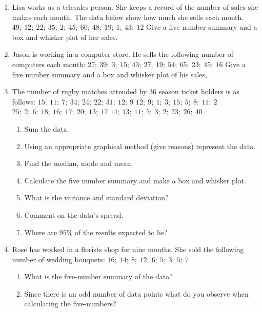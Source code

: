 {
\begin{enumerate}
\item Lisa works as a telesales person. She keeps a record of the number of sales she makes each month. The data below show how much she sells each month. \newline
\textbf{$49; ~12; ~22; ~35; ~2; ~45;~ 60; ~48; ~19; ~1;~ 43; ~12$} \newline
Give a five number summary and a box and whisker plot of her sales. 
\item Jason is working in a computer store. He sells the following number of computers each month: \newline
\textbf{$27; ~39; ~3; ~15; ~43; ~27; ~19; ~54; ~65; ~23; ~45; ~16$} \newline
Give a five number summary and a box and whisker plot of his sales,
\item The number of rugby matches attended by 36 season ticket holders is as follows: \newline
\textbf{$15; ~11;~ 7;~ 34;~ 24;~ 22;~ 31;~ 12;~ 9$} \newline
\textbf{$12;~ 9;~ 1;~ 3;~ 15;~ 5;~ 8;~ 11;~ 2$} \newline
\textbf{$25;~ 2;~ 6; ~18; ~16; ~17; ~20; ~13; ~17$} \newline
\textbf{$14;~ 13;~ 11; ~5; ~3; ~2; ~23; ~26; ~40$} \newline
	\begin{enumerate}
	\item Sum the data.
	\item Using an appropriate graphical method (give reasons) represent the data.
	\item Find the median, mode and mean.
	\item Calculate the five number summary and make a box and whisker plot.
	\item What is the variance and standard deviation?
	\item Comment on the data's spread.
	\item Where are $95\%$ of the results expected to lie?
	\end{enumerate}
\item Rose has worked in a florists shop for nine months. She sold the following number of wedding bouquets: \newline
\textbf{$16;~ 14;~ 8;~ 12;~ 6; ~5; ~3; ~5; ~7$} \newline
	\begin{enumerate}
	\item What is the five-number summary of the data?
	\item Since there is an odd number of data points what do you observe when calculating the five-numbers?
	\end{enumerate}
\end{enumerate}


}
